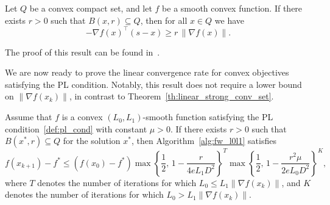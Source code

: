 \documentclass[runningheads]{llncs}
\begin{document}
	\begin{proposition}\label{prop:scaling_condition_for_convex_set}
		Let $Q$ be a convex compact set, and let $f$ be a smooth convex function.  
		If there exists $r > 0$ such that $B(x,r) \subseteq Q$, then for all $x \in Q$ we have
		\[
		- \nabla f(x)^\top (s - x) \geq r\,\|\nabla f(x)\|.
		\]
	\end{proposition}
	
	The proof of this result can be found in~\cite[Proposition~2.16]{braun2022conditional}.
	
	We are now ready to prove the linear convergence rate for convex objectives satisfying the PL condition.  
	Notably, this result does not require a lower bound on $\|\nabla f(x_k)\|$, in contrast to Theorem~\ref{th:linear_strong_conv_set}.
	
	\begin{theorem}\label{th:linear_conv_pl_cond}
		Assume that $f$ is a convex $(L_0, L_1)$-smooth function satisfying the PL condition~\ref{def:pl_cond} with constant $\mu > 0$.  
		If there exists $r > 0$ such that $B(x^*, r) \subseteq Q$ for the solution $x^*$, then Algorithm~\ref{alg:fw_l0l1} satisfies
		\[
		f(x_{k+1}) - f^*
		\leq (f(x_0) - f^*)
		\max\!\left\{\frac{1}{2},\, 1 - \frac{r}{4 e L_1 D^2}\right\}^{T}
		\max\!\left\{\frac{1}{2},\, 1 - \frac{r^2 \mu}{2 e L_0 D^2}\right\}^{K},
		\]
		where $T$ denotes the number of iterations for which $L_0 \leq L_1 \|\nabla f(x_k)\|$,  
		and $K$ denotes the number of iterations for which $L_0 > L_1 \|\nabla f(x_k)\|$.
	\end{theorem}
	
\end{document}
